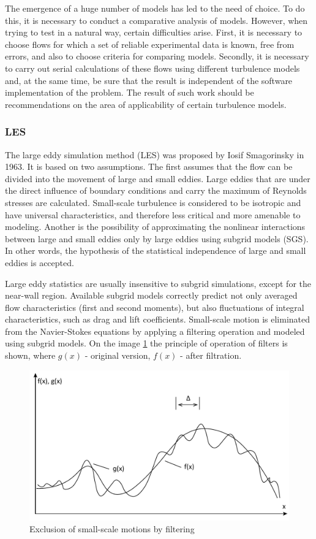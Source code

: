 	The emergence of a huge number of models has led to the need of choice. To do this, it is necessary to conduct a comparative analysis of models. However, when trying to test in a natural way, certain difficulties arise. First, it is necessary to choose flows for which a set of reliable experimental data is known, free from errors, and also to choose criteria for comparing models. Secondly, it is necessary to carry out serial calculations of these flows using different turbulence models and, at the same time, be sure that the result is independent of the software implementation of the problem. The result of such work should be recommendations on the area of applicability of certain turbulence models.
	
\subsubsection{LES}
	The large eddy simulation method (LES) was proposed by Iosif Smagorinsky in 1963. It is based on two assumptions. The first assumes that the flow can be divided into the movement of large and small eddies. Large eddies that are under the direct influence of boundary conditions and carry the maximum of Reynolds stresses are calculated. Small-scale turbulence is considered to be isotropic and have universal characteristics, and therefore less critical and more amenable to modeling. Another is the possibility of approximating the nonlinear interactions between large and small eddies only by large eddies using subgrid models (SGS). In other words, the hypothesis of the statistical independence of large and small eddies is accepted.
	
	Large eddy statistics are usually insensitive to subgrid simulations, except for the near-wall region. Available subgrid models correctly predict not only averaged flow characteristics (first and second moments), but also fluctuations of integral characteristics, such as drag and lift coefficients\cite{Fureby2000}. Small-scale motion is eliminated from the Navier-Stokes equations by applying a filtering operation and modeled using subgrid models. On the image \ref{fig:lesfilter} the principle of operation of filters is shown, where $g(x)$ - original version, $f(x)$ - after filtration.\\
	\begin{figure}[H]
		\centering
		\includegraphics[width=0.7\linewidth]{../Assets/ФильтрацияLES}
		\caption{\footnotesize{Exclusion of small-scale motions by filtering}}
		\label{fig:lesfilter}
	\end{figure}

